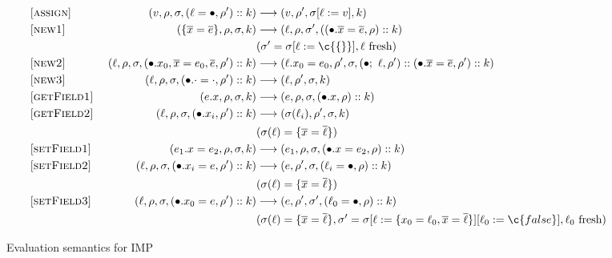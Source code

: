 \begin{figure*}
\begin{center}
\begin{align*}
\\
  \omit [\textsc{assign}] &&
    (v, \rho, \sigma, (\ell = \bullet, \rho')::k)
    & \longrightarrow
    (v, \rho', \sigma[\ell := v], k)
\\
  \omit [\textsc{new1}] &&
    (\{ \overline{x} = \overline{e} \}, \rho, \sigma, k)
    & \longrightarrow
    (\ell, \rho, \sigma', (\init{\overline{x}}{\overline{e}}{\rho}::k)
        \\ &&& (\sigma' = \sigma[\ell := \c{\{\}}], \ell~\mbox{fresh})
\\
  \omit [\textsc{new2}] &&
    (\ell, \rho, \sigma, \init{x_0,\overline{x}}{e_0,\overline{e}}{\rho'}::k)
    & \longrightarrow
    (\ell.x_0 = e_0, \rho', \sigma,
    \then{\ell}{\rho'}::\init{\overline{x}}{\overline{e}}{\rho'}::k)
\\
  \omit [\textsc{new3}] &&
    (\ell, \rho, \sigma, \init{\cdot}{\cdot}{\rho'}::k)
    & \longrightarrow
    (\ell, \rho', \sigma, k)
\\
  \omit [\textsc{getField1}] &&
    (e.x, \rho, \sigma, k)
    & \longrightarrow
    (e, \rho, \sigma, (\bullet.x, \rho)::k)
\\
  \omit [\textsc{getField2}] &&
    (\ell, \rho, \sigma, (\bullet.x_i, \rho')::k)
    & \longrightarrow
    (\sigma(\ell_i), \rho', \sigma, k)
        \\ &&& (\sigma(\ell) = \{ \overline{x} = \overline{\ell}\})
\\
  \omit [\textsc{setField1}] &&
    (e_1.x = e_2, \rho, \sigma, k)
    & \longrightarrow
    (e_1, \rho, \sigma, (\bullet.x = e_2, \rho)::k)
\\
  \omit [\textsc{setField2}] &&
    (\ell, \rho, \sigma, (\bullet.x_i = e, \rho')::k)
    & \longrightarrow
    (e, \rho', \sigma, (\ell_i = \bullet, \rho)::k)
        \\ &&& (\sigma(\ell) = \{ \overline{x} = \overline{\ell}\})
\\
  \omit [\textsc{setField3}] &&
    (\ell, \rho, \sigma, (\bullet.x_0 = e, \rho')::k)
    & \longrightarrow
    (e, \rho', \sigma', (\ell_0 = \bullet, \rho)::k)
        \\ &&& (
                \sigma(\ell) = \{ \overline{x} = \overline{\ell} \},
                \sigma' =
                \sigma[\ell := \{ x_0 = \ell_0, \overline{x} = \overline{\ell} \}
                       ][\ell_0 := \c{false}], \ell_0~\mbox{fresh})
\\
\end{align*}
  \end{center}

\caption{Evaluation semantics for IMP}
\label{fig:imp-cesk}
\end{figure*}
    

